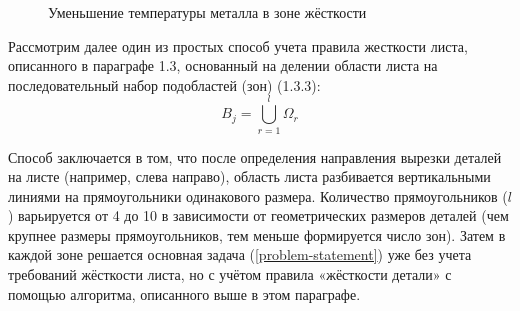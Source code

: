 \documentclass{article}
\begin{document}
\begin{figure}
  \centering
  \caption{Уменьшение температуры металла в зоне жёсткости }
  \label{thermal-550-130}
\end{figure}



Рассмотрим далее один из простых способ учета правила жесткости листа,
описанного в параграфе 1.3,
основанный на делении области листа на
последовательный набор подобластей (зон) (1.3.3):
$$
B_j =
\bigcup_{r=1}^l \Omega_r
$$

Способ заключается в том,
что после определения направления вырезки деталей на листе
(например, слева направо),
область листа разбивается вертикальными линиями
на прямоугольники одинакового размера.
Количество прямоугольников ($l$)
варьируется от 4 до 10 в зависимости от
геометрических размеров деталей
(чем крупнее размеры прямоугольников,
тем меньше формируется число зон).
Затем в каждой зоне решается основная задача (\ref{problem-statement})
уже без учета требований жёсткости листа,
но с учётом правила «жёсткости детали»
с помощью  алгоритма, описанного выше в этом параграфе.
\end{document}
